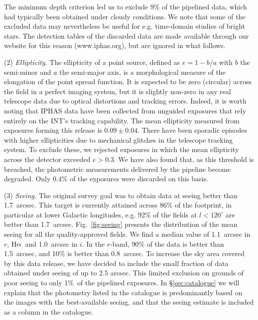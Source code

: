 \documentclass[useAMS,usenatbib]{mn2e}
\def\ha{\mbox{H$\rm \alpha$}}
\begin{document}
The minimum depth criterion
led us to exclude 9\% of the pipelined data,
which had typically been obtained under cloudy conditions.
We note that some of the excluded data may nevertheless be useful
for e.g. time-domain studies of bright stars.
The detection tables of the discarded data are made
available through our website for this reason (www.iphas.org),
but are ignored in what follows.

(2) \emph{Ellipticity.} 
The ellipticity of a point source,
defined as $e = 1 - b / a$ 
with $b$ the semi-minor and $a$ the semi-major axis,
is a morphological measure of the elongation of the point spread function.
It is expected to be zero (circular) across the field 
in a perfect imaging system,
but it is slightly non-zero in any real telescope data 
due to optical distortions and tracking errors.  Indeed, it is worth noting
that IPHAS data have been collected from unguided exposures that rely
entirely on the INT's tracking capability.
The mean ellipticity measured 
from exposures forming this release
is $0.09\pm0.04$.
There have been sporadic episodes with higher ellipticities
due to mechanical glitches in the telescope tracking system.
To exclude these, we rejected exposures in which the mean ellipticity
across the detector exceeded $e > 0.3$. We have also found that, as
this threshold is breached, the photometric measurements delivered by 
the pipeline become degraded.
Only 0.4\% of the exposures were discarded on this basis.

(3) \emph{Seeing.} 
The original survey goal was to obtain data 
at seeing better than 1.7~arcsec.
This target is currently attained across 86\% of the footprint,
in particular at lower Galactic longitudes,
e.g. 92\% of the fields at $l<120^\circ$ are better than 1.7~arcsec.
Fig.~\ref{fig:seeing} presents the distribution
of the mean seeing for all the quality-approved fields.
We find a median value of 1.1~arcsec in $r$, \ha\
and 1.0~arcsec in $i$.
In the $r$-band, 90\% of the data is better than 1.5~arcsec,
and 10\% is better than 0.8~arcsec.
To increase the sky area covered by this data release,
we have decided to include the small fraction of data
obtained under seeing of up to 2.5 arcsec.  This limited
exclusion on grounds of poor seeing to only 1\%\ of the pipelined 
exposures. 
In \S\ref{sec:catalogue} we will explain
that the photometry listed in the catalogue
is predominantly based on the images with the
best-available seeing, and that the seeing estimate
is included as a column in the catalogue.
\end{document}
